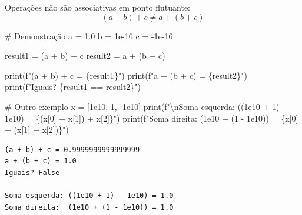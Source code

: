 \documentclass[
  11pt,
  letterpaper,
  DIV=11,
  numbers=noendperiod]{scrartcl}
\newenvironment{Shaded}{\begin{snugshade}}{\end{snugshade}}
\newcommand{\BuiltInTok}[1]{\textcolor[rgb]{0.00,0.23,0.31}{#1}}
\newcommand{\CharTok}[1]{\textcolor[rgb]{0.13,0.47,0.30}{#1}}
\newcommand{\CommentTok}[1]{\textcolor[rgb]{0.37,0.37,0.37}{#1}}
\newcommand{\DecValTok}[1]{\textcolor[rgb]{0.68,0.00,0.00}{#1}}
\newcommand{\FloatTok}[1]{\textcolor[rgb]{0.68,0.00,0.00}{#1}}
\newcommand{\NormalTok}[1]{\textcolor[rgb]{0.00,0.23,0.31}{#1}}
\newcommand{\OperatorTok}[1]{\textcolor[rgb]{0.37,0.37,0.37}{#1}}
\newcommand{\SpecialCharTok}[1]{\textcolor[rgb]{0.37,0.37,0.37}{#1}}
\newcommand{\SpecialStringTok}[1]{\textcolor[rgb]{0.13,0.47,0.30}{#1}}
\begin{document}
Operações não são associativas em ponto flutuante:
\[(a + b) + c \neq a + (b + c)\]

\begin{Shaded}
\begin{Highlighting}[]
\CommentTok{\# Demonstração}
\NormalTok{a }\OperatorTok{=} \FloatTok{1.0}
\NormalTok{b }\OperatorTok{=} \FloatTok{1e{-}16}
\NormalTok{c }\OperatorTok{=} \OperatorTok{{-}}\FloatTok{1e{-}16}

\NormalTok{result1 }\OperatorTok{=}\NormalTok{ (a }\OperatorTok{+}\NormalTok{ b) }\OperatorTok{+}\NormalTok{ c}
\NormalTok{result2 }\OperatorTok{=}\NormalTok{ a }\OperatorTok{+}\NormalTok{ (b }\OperatorTok{+}\NormalTok{ c)}

\BuiltInTok{print}\NormalTok{(}\SpecialStringTok{f"(a + b) + c = }\SpecialCharTok{\{}\NormalTok{result1}\SpecialCharTok{\}}\SpecialStringTok{"}\NormalTok{)}
\BuiltInTok{print}\NormalTok{(}\SpecialStringTok{f"a + (b + c) = }\SpecialCharTok{\{}\NormalTok{result2}\SpecialCharTok{\}}\SpecialStringTok{"}\NormalTok{)}
\BuiltInTok{print}\NormalTok{(}\SpecialStringTok{f"Iguais? }\SpecialCharTok{\{}\NormalTok{result1 }\OperatorTok{==}\NormalTok{ result2}\SpecialCharTok{\}}\SpecialStringTok{"}\NormalTok{)}

\CommentTok{\# Outro exemplo}
\NormalTok{x }\OperatorTok{=}\NormalTok{ [}\FloatTok{1e10}\NormalTok{, }\DecValTok{1}\NormalTok{, }\OperatorTok{{-}}\FloatTok{1e10}\NormalTok{]}
\BuiltInTok{print}\NormalTok{(}\SpecialStringTok{f"}\CharTok{\textbackslash{}n}\SpecialStringTok{Soma esquerda: ((1e10 + 1) {-} 1e10) = }\SpecialCharTok{\{}\NormalTok{(x[}\DecValTok{0}\NormalTok{] }\OperatorTok{+}\NormalTok{ x[}\DecValTok{1}\NormalTok{]) }\OperatorTok{+}\NormalTok{ x[}\DecValTok{2}\NormalTok{]}\SpecialCharTok{\}}\SpecialStringTok{"}\NormalTok{)}
\BuiltInTok{print}\NormalTok{(}\SpecialStringTok{f"Soma direita:  (1e10 + (1 {-} 1e10)) = }\SpecialCharTok{\{}\NormalTok{x[}\DecValTok{0}\NormalTok{] }\OperatorTok{+}\NormalTok{ (x[}\DecValTok{1}\NormalTok{] }\OperatorTok{+}\NormalTok{ x[}\DecValTok{2}\NormalTok{])}\SpecialCharTok{\}}\SpecialStringTok{"}\NormalTok{)}
\end{Highlighting}
\end{Shaded}

\begin{verbatim}
(a + b) + c = 0.9999999999999999
a + (b + c) = 1.0
Iguais? False

Soma esquerda: ((1e10 + 1) - 1e10) = 1.0
Soma direita:  (1e10 + (1 - 1e10)) = 1.0
\end{verbatim}
\end{document}
